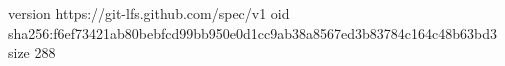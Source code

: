 version https://git-lfs.github.com/spec/v1
oid sha256:f6ef73421ab80bebfcd99bb950e0d1cc9ab38a8567ed3b83784c164c48b63bd3
size 288
